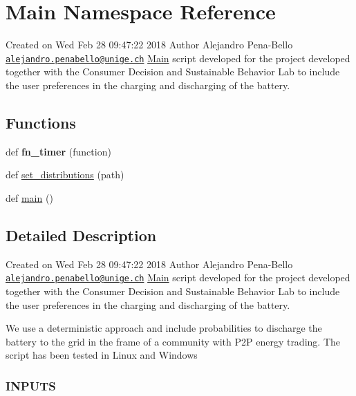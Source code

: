 \hypertarget{namespace_main}{}\section{Main Namespace Reference}
\label{namespace_main}


Created on Wed Feb 28 09\+:47\+:22 2018 Author Alejandro Pena-\/\+Bello \href{mailto:alejandro.penabello@unige.ch}{\tt alejandro.\+penabello@unige.\+ch} \mbox{\hyperlink{namespace_main}{Main}} script developed for the project developed together with the Consumer Decision and Sustainable Behavior Lab to include the user preferences in the charging and discharging of the battery.  


\subsection*{Functions}
\begin{DoxyCompactItemize}
\item 
\mbox{\label{namespace_main_add8b130225fb655f75f69fb058476c6d}} 
def {\bfseries fn\+\_\+timer} (function)
\item 
def \mbox{\hyperlink{namespace_main_abdb739977f22445f24edb008e9598bac}{set\+\_\+distributions}} (path)
\item 
def \mbox{\hyperlink{namespace_main_ad808d947fc74de474e04b89fd9431ec8}{main}} ()
\end{DoxyCompactItemize}


\subsection{Detailed Description}
Created on Wed Feb 28 09\+:47\+:22 2018 Author Alejandro Pena-\/\+Bello \href{mailto:alejandro.penabello@unige.ch}{\tt alejandro.\+penabello@unige.\+ch} \mbox{\hyperlink{namespace_main}{Main}} script developed for the project developed together with the Consumer Decision and Sustainable Behavior Lab to include the user preferences in the charging and discharging of the battery. 

We use a deterministic approach and include probabilities to discharge the battery to the grid in the frame of a community with P2P energy trading. The script has been tested in Linux and Windows \subsubsection*{I\+N\+P\+U\+TS }

